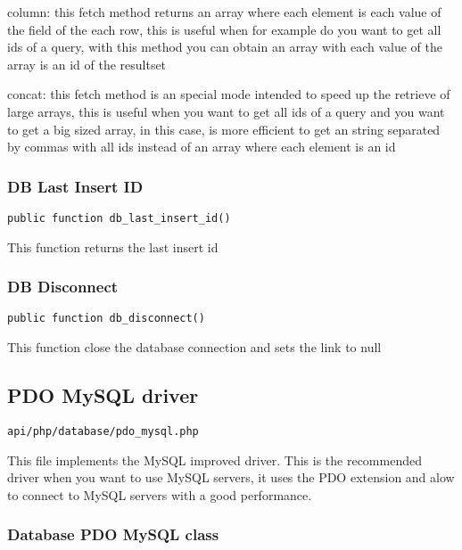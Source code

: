 \documentclass[a4paper]{article}
\begin{document}
column: this fetch method returns an array where each element is each value of the field of
the each row, this is useful when for example do you want to get all ids of a query, with
this method you can obtain an array with each value of the array is an id of the resultset

concat: this fetch method is an special mode intended to speed up the retrieve of large
arrays, this is useful when you want to get all ids of a query and you want to get a big
sized array, in this case, is more efficient to get an string separated by commas with all
ids instead of an array where each element is an id

\hypertarget{toc333}{}
\subsubsection{DB Last Insert ID}

\begin{lstlisting}
public function db_last_insert_id()
\end{lstlisting}

This function returns the last insert id

\hypertarget{toc334}{}
\subsubsection{DB Disconnect}

\begin{lstlisting}
public function db_disconnect()
\end{lstlisting}

This function close the database connection and sets the link to null

\hypertarget{toc335}{}
\subsection{PDO MySQL driver}

\begin{lstlisting}
api/php/database/pdo_mysql.php
\end{lstlisting}

This file implements the MySQL improved driver. This is the recommended driver when you want
to use MySQL servers, it uses the PDO extension and alow to connect to MySQL servers with a
good performance.

\hypertarget{toc336}{}
\subsubsection{Database PDO MySQL class}
\end{document}
